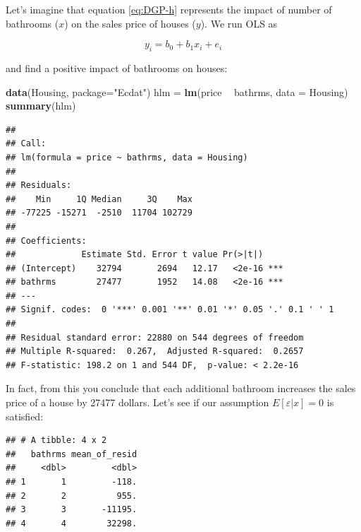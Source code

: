 \documentclass[]{book}
\newenvironment{Shaded}{\begin{snugshade}}{\end{snugshade}}
\newcommand{\KeywordTok}[1]{\textcolor[rgb]{0.13,0.29,0.53}{\textbf{#1}}}
\newcommand{\DataTypeTok}[1]{\textcolor[rgb]{0.13,0.29,0.53}{#1}}
\newcommand{\StringTok}[1]{\textcolor[rgb]{0.31,0.60,0.02}{#1}}
\newcommand{\CommentTok}[1]{\textcolor[rgb]{0.56,0.35,0.01}{\textit{#1}}}
\newcommand{\OperatorTok}[1]{\textcolor[rgb]{0.81,0.36,0.00}{\textbf{#1}}}
\newcommand{\NormalTok}[1]{#1}
\begin{document}
Let's imagine that equation \eqref{eq:DGP-h} represents the impact of
number of bathrooms (\(x\)) on the sales price of houses (\(y\)). We run
OLS as

\[
y_i = b_0 + b_1 x_i + e_i 
\]

and find a positive impact of bathrooms on houses:

\begin{Shaded}
\begin{Highlighting}[]
\KeywordTok{data}\NormalTok{(Housing, }\DataTypeTok{package=}\StringTok{"Ecdat"}\NormalTok{)}
\NormalTok{hlm =}\StringTok{ }\KeywordTok{lm}\NormalTok{(price }\OperatorTok{~}\StringTok{ }\NormalTok{bathrms, }\DataTypeTok{data =}\NormalTok{ Housing)}
\KeywordTok{summary}\NormalTok{(hlm)}
\end{Highlighting}
\end{Shaded}

\begin{verbatim}
## 
## Call:
## lm(formula = price ~ bathrms, data = Housing)
## 
## Residuals:
##    Min     1Q Median     3Q    Max 
## -77225 -15271  -2510  11704 102729 
## 
## Coefficients:
##             Estimate Std. Error t value Pr(>|t|)    
## (Intercept)    32794       2694   12.17   <2e-16 ***
## bathrms        27477       1952   14.08   <2e-16 ***
## ---
## Signif. codes:  0 '***' 0.001 '**' 0.01 '*' 0.05 '.' 0.1 ' ' 1
## 
## Residual standard error: 22880 on 544 degrees of freedom
## Multiple R-squared:  0.267,  Adjusted R-squared:  0.2657 
## F-statistic: 198.2 on 1 and 544 DF,  p-value: < 2.2e-16
\end{verbatim}

In fact, from this you conclude that each additional bathroom increases
the sales price of a house by 27477 dollars. Let's see if our assumption
\(E[\varepsilon|x] = 0\) is satisfied:

\begin{Shaded}
\end{Shaded}

\begin{verbatim}
## # A tibble: 4 x 2
##   bathrms mean_of_resid
##     <dbl>         <dbl>
## 1       1         -118.
## 2       2          955.
## 3       3       -11195.
## 4       4        32298.
\end{verbatim}
\end{document}
